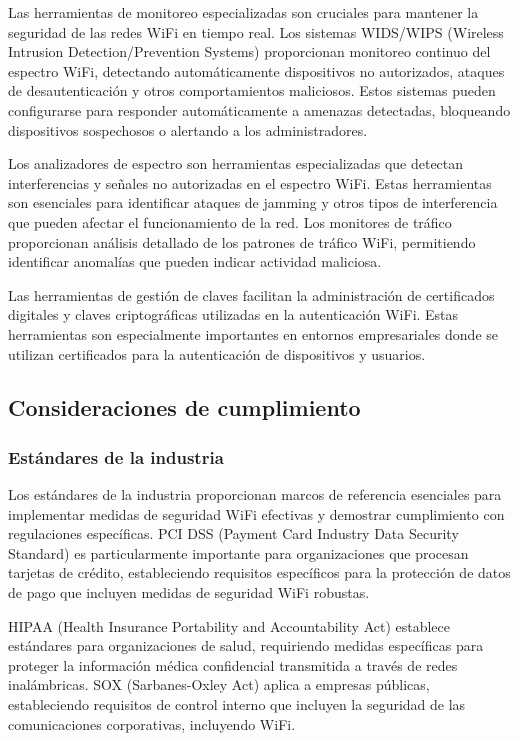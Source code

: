 Las herramientas de monitoreo especializadas son cruciales para mantener la seguridad de las redes WiFi en tiempo real. Los sistemas WIDS/WIPS (Wireless Intrusion Detection/Prevention Systems) proporcionan monitoreo continuo del espectro WiFi, detectando automáticamente dispositivos no autorizados, ataques de desautenticación y otros comportamientos maliciosos. Estos sistemas pueden configurarse para responder automáticamente a amenazas detectadas, bloqueando dispositivos sospechosos o alertando a los administradores.

Los analizadores de espectro son herramientas especializadas que detectan interferencias y señales no autorizadas en el espectro WiFi. Estas herramientas son esenciales para identificar ataques de jamming y otros tipos de interferencia que pueden afectar el funcionamiento de la red. Los monitores de tráfico proporcionan análisis detallado de los patrones de tráfico WiFi, permitiendo identificar anomalías que pueden indicar actividad maliciosa.

Las herramientas de gestión de claves facilitan la administración de certificados digitales y claves criptográficas utilizadas en la autenticación WiFi. Estas herramientas son especialmente importantes en entornos empresariales donde se utilizan certificados para la autenticación de dispositivos y usuarios.

\subsection{Consideraciones de cumplimiento}

\subsubsection{Estándares de la industria}

Los estándares de la industria proporcionan marcos de referencia esenciales para implementar medidas de seguridad WiFi efectivas y demostrar cumplimiento con regulaciones específicas. PCI DSS (Payment Card Industry Data Security Standard) es particularmente importante para organizaciones que procesan tarjetas de crédito, estableciendo requisitos específicos para la protección de datos de pago que incluyen medidas de seguridad WiFi robustas.

HIPAA (Health Insurance Portability and Accountability Act) establece estándares para organizaciones de salud, requiriendo medidas específicas para proteger la información médica confidencial transmitida a través de redes inalámbricas. SOX (Sarbanes-Oxley Act) aplica a empresas públicas, estableciendo requisitos de control interno que incluyen la seguridad de las comunicaciones corporativas, incluyendo WiFi.

